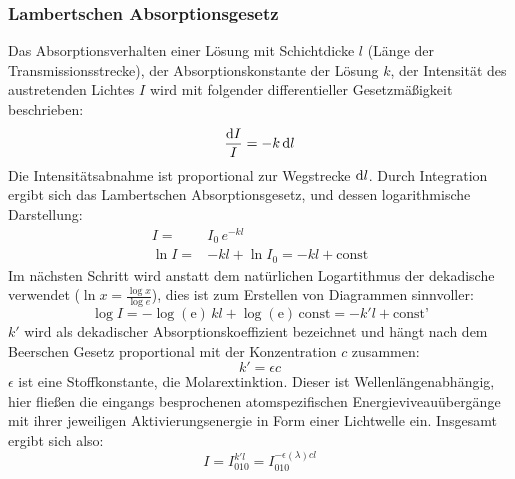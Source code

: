 \subsubsection{Lambertschen Absorptionsgesetz}
Das Absorptionsverhalten einer Lösung mit Schichtdicke \(l\) (Länge der Transmissionsstrecke), der Absorptionskonstante der Lösung \(k\), der Intensität des austretenden Lichtes \(I\) wird mit folgender differentieller Gesetzmäßigkeit beschrieben:
\begin{equation}
    \frac{\mathop{}\!\mathrm{d} I}{I}=-k\mathop{}\!\mathrm{d} l
    \label{Lambert_diff}
\end{equation}
Die Intensitätsabnahme ist proportional zur Wegstrecke \(\mathop{}\!\mathrm{d} l\). Durch Integration ergibt sich das Lambertschen Absorptionsgesetz, und dessen logarithmische Darstellung:
\begin{align}
    I=&I_0\,e^{-kl}\\
    \ln{I}=&-kl+\ln{I_0}=-kl+\text{const} 
    \label{Lambert}
\end{align}
Im nächsten Schritt wird anstatt dem natürlichen Logartithmus der dekadische verwendet (\(\ln{x}=\tfrac{\log{x}}{\log{e}}\)), dies ist zum Erstellen von Diagrammen sinnvoller:
\begin{equation}
    \log{I}=-\log{(\mathrm{e})}\,kl+\log{(\mathrm{e})}\,\text{const}=-k'l+\text{const'}
    \label{k'}
\end{equation}
\(k'\) wird als \glqq dekadischer Absorptionskoeffizient\grqq{} bezeichnet und hängt nach dem Beerschen Gesetz proportional mit der Konzentration \(c\) zusammen: 
\begin{equation}
    k'=\epsilon c 
    \label{Beersches}
\end{equation}
\(\epsilon\) ist eine Stoffkonstante, die Molarextinktion. Dieser ist Wellenlängenabhängig, hier fließen die eingangs besprochenen atomspezifischen Energieviveauübergänge mit ihrer jeweiligen Aktivierungsenergie in Form einer Lichtwelle ein.
Insgesamt ergibt sich also:
\begin{equation}
    I=I_010^{k'l}=I_010^{-\epsilon(\lambda)cl}
    \label{dekadisch}
\end{equation}
